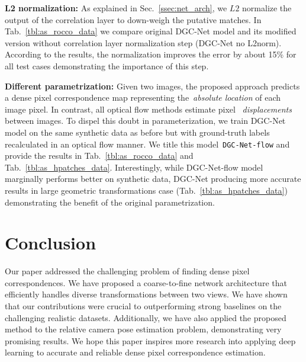 \documentclass[10pt,twocolumn,letterpaper]{article}
\begin{document}
\noindent\textbf{L2 normalization:} As explained in Sec.~\ref{ssec:net_arch}, we $L2$ normalize the output of the correlation layer to down-weigh the putative matches. In Tab.~\ref{tbl:as_rocco_data} we compare original DGC-Net model and its modified version without correlation layer normalization step (DGC-Net no L2norm). According to the results, the normalization improves the error by about 15\% for all test cases demonstrating the importance of this step.

\noindent\textbf{Different parametrization:} Given two images, the proposed approach predicts a dense pixel correspondence map representing the~\textit{absolute location} of each image pixel. In contrast, all optical flow methods estimate pixel ~\textit{displacements} between images. To dispel this doubt in parameterization, we train DGC-Net model on the same synthetic data as before but with ground-truth labels recalculated in an optical flow manner. We title this model~\texttt{DGC-Net-flow} and provide the results in Tab.~\ref{tbl:as_rocco_data} and Tab.~\ref{tbl:as_hpatches_data}. Interestingly, while DGC-Net-flow model marginally performs better on synthetic data, DGC-Net producing more accurate results in large geometric transformations case (Tab.~\ref{tbl:as_hpatches_data}) demonstrating the benefit of the original parametrization.
\vspace{-2mm}
\section{Conclusion}
Our paper addressed the challenging problem of finding dense pixel correspondences. We have proposed a coarse-to-fine network architecture that efficiently handles diverse transformations between two views. We have shown that our contributions were crucial to outperforming strong baselines on the challenging realistic datasets. Additionally, we have also applied the proposed method to the relative camera pose estimation problem, demonstrating very promising results. We hope this paper inspires more research into applying deep learning to accurate and reliable dense pixel correspondence estimation.
\end{document}
